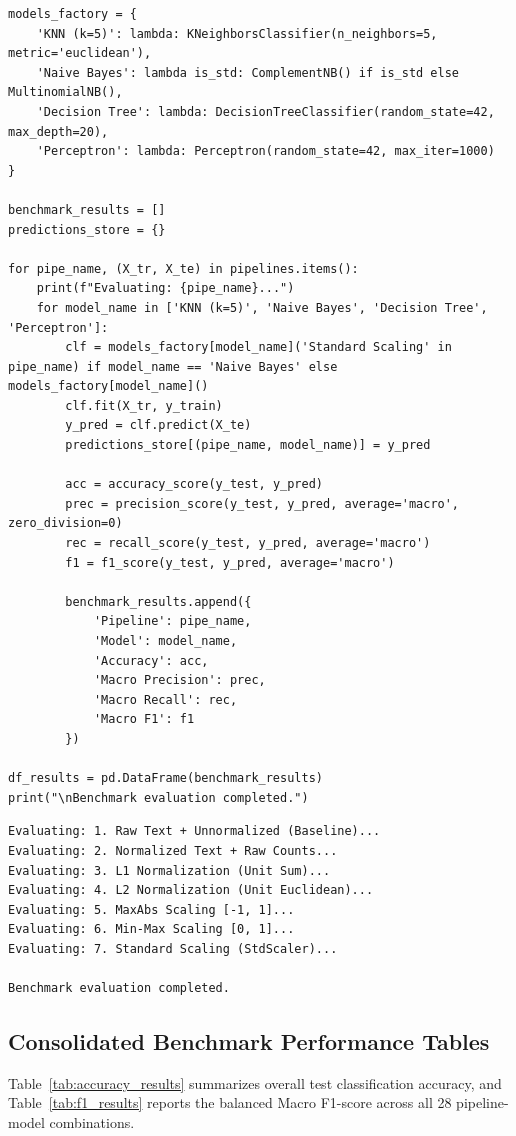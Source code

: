 \documentclass[12pt]{article}
\begin{document}
\begin{lstlisting}[style=code]
models_factory = {
    'KNN (k=5)': lambda: KNeighborsClassifier(n_neighbors=5, metric='euclidean'),
    'Naive Bayes': lambda is_std: ComplementNB() if is_std else MultinomialNB(),
    'Decision Tree': lambda: DecisionTreeClassifier(random_state=42, max_depth=20),
    'Perceptron': lambda: Perceptron(random_state=42, max_iter=1000)
}

benchmark_results = []
predictions_store = {}

for pipe_name, (X_tr, X_te) in pipelines.items():
    print(f"Evaluating: {pipe_name}...")
    for model_name in ['KNN (k=5)', 'Naive Bayes', 'Decision Tree', 'Perceptron']:
        clf = models_factory[model_name]('Standard Scaling' in pipe_name) if model_name == 'Naive Bayes' else models_factory[model_name]()
        clf.fit(X_tr, y_train)
        y_pred = clf.predict(X_te)
        predictions_store[(pipe_name, model_name)] = y_pred

        acc = accuracy_score(y_test, y_pred)
        prec = precision_score(y_test, y_pred, average='macro', zero_division=0)
        rec = recall_score(y_test, y_pred, average='macro')
        f1 = f1_score(y_test, y_pred, average='macro')

        benchmark_results.append({
            'Pipeline': pipe_name,
            'Model': model_name,
            'Accuracy': acc,
            'Macro Precision': prec,
            'Macro Recall': rec,
            'Macro F1': f1
        })

df_results = pd.DataFrame(benchmark_results)
print("\nBenchmark evaluation completed.")
\end{lstlisting}

\begin{lstlisting}[style=output]
Evaluating: 1. Raw Text + Unnormalized (Baseline)...
Evaluating: 2. Normalized Text + Raw Counts...
Evaluating: 3. L1 Normalization (Unit Sum)...
Evaluating: 4. L2 Normalization (Unit Euclidean)...
Evaluating: 5. MaxAbs Scaling [-1, 1]...
Evaluating: 6. Min-Max Scaling [0, 1]...
Evaluating: 7. Standard Scaling (StdScaler)...

Benchmark evaluation completed.
\end{lstlisting}

\subsection{Consolidated Benchmark Performance Tables}
Table~\ref{tab:accuracy_results} summarizes overall test classification accuracy, and Table~\ref{tab:f1_results} reports the balanced Macro F1-score across all 28 pipeline-model combinations.
\end{document}
